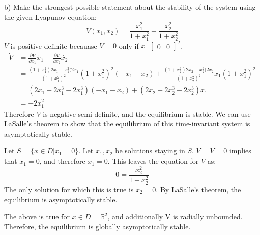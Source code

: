 \documentclass[paper=a4, fontsize=11pt]{scrartcl} %
\numberwithin{equation}{section} %
\numberwithin{figure}{section} %
\numberwithin{table}{section} %
\begin{document}
b) Make the strongest possible statement about the stability of the system using the given Lyapunov equation:
\begin{equation}
V(x_1, x_2) = \frac{x_1^2}{1+x_1^2}+\frac{x_2^2}{1+x_2^2}
\end{equation}
$V$ is positive definite becauase $V=0$ only if $x^= \begin{bmatrix}0 & 0\end{bmatrix}^T$.
\begin{align}
\dot{V} &= \frac{\partial V}{\partial x_1}\dot{x_1} + \frac{\partial V}{\partial x_2}\dot{x_2} \\
&= \frac{(1+x_1^2)2x_1 - x_1^2(2x_1}{(1+x_1^2)^2}(1+x_1^2)^2(-x_1-x_2) + \frac{(1+x_2^2)2x_2 - x_2^2(2x_2}{(1+x_2^2)^2}x_1(1+x_1^2)^2 \\
&= (2x_1+2x_1^3 - 2x_1^3)(-x_1-x_2) + (2x_2+2x_2^3-2x_2^3)x_1\\
&= -2x_1^2
\end{align}
Therefore $\dot{V}$ is negative semi-definite, and the equilibrium is stable. We can use LaSalle's theorem to show that the equilibrium of this time-invariant system is asymptotically stable.

Let $S=\{x \in D | x_1=0 \}$. Let $x_1, x_2$ be solutions staying in $S$. $V=\dot{V}=0$ implies that $x_1=0$, and therefore $\dot{x_1}=0$. This leaves the equation for $V$ as:
\begin{equation}
0 = \frac{x_2^2}{1+x_2^2}
\end{equation}
The only solution for which this is true is $x_2=0$. By LaSalle's theorem, the equilibrium is asymptotically stable. 

The above is true for $x \in D = \mathbb{R}^2$, and additionally V is radially unbounded. Therefore, the equilibrium is globally asymptotically stable.
\newpage
\end{document}
